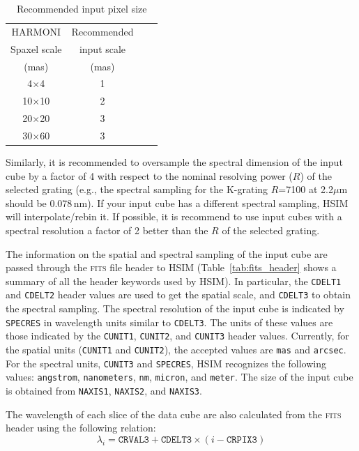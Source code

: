 \documentclass[12pt]{report}
\begin{document}
\begin{table}[h]
\centering
\caption{Recommended input pixel size}
\label{tab:scale}
\begin{tabular}{cccc}
\hline
HARMONI & Recommended\\
Spaxel scale & input scale\\
(mas) & (mas) \\
\hline
4$\times$4   & 1 \\
10$\times$10 & 2 \\
20$\times$20 & 3 \\
30$\times$60 & 3 \\
\hline
\end{tabular}
\end{table}

Similarly, it is recommended to oversample the spectral dimension of the input cube by a factor of 4 with respect to the nominal resolving power ($R$) of the selected grating (e.g., the spectral sampling for the K-grating $R$=7100 at 2.2$\mu$m should be 0.078\,nm). If your input cube has a different spectral sampling, HSIM will interpolate\slash rebin it. If possible, it is recommend to use input cubes with a spectral resolution a factor of 2 better than the $R$ of the selected grating.

The information on the spatial and spectral sampling of the input cube are passed through the \textsc{fits} file header to HSIM (Table~\ref{tab:fits_header} shows a summary of all the header keywords used by HSIM). In particular, the \texttt{CDELT1} and \texttt{CDELT2} header values are used to get the spatial scale, and \texttt{CDELT3} to obtain the spectral sampling. The spectral resolution of the input cube is indicated by \texttt{SPECRES} in wavelength units similar to \texttt{CDELT3}. The units of these values are those indicated by the \texttt{CUNIT1}, \texttt{CUNIT2}, and \texttt{CUNIT3} header values. Currently, for the spatial units (\texttt{CUNIT1} and \texttt{CUNIT2}), the accepted values are \texttt{mas} and \texttt{arcsec}. For the spectral units, \texttt{CUNIT3} and \texttt{SPECRES}, HSIM recognizes the following values: \texttt{angstrom}, \texttt{nanometers}, \texttt{nm}, \texttt{micron}, and \texttt{meter}. The size of the input cube is obtained from \texttt{NAXIS1}, \texttt{NAXIS2}, and \texttt{NAXIS3}.


The wavelength of each slice of the data cube are also calculated from the \textsc{fits} header using the following relation:
\begin{equation}\label{eq:lambda}
\lambda_i = \texttt{CRVAL3} + \texttt{CDELT3} \times (i - \texttt{CRPIX3})
\end{equation}
\end{document}
